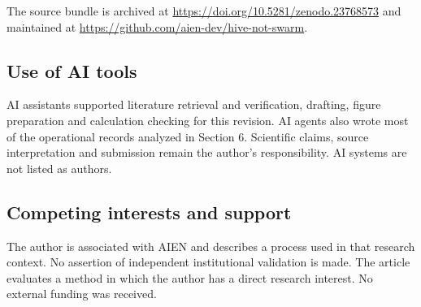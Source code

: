 \documentclass[11pt]{article}
\begin{document}
The source bundle is archived at \url{https://doi.org/10.5281/zenodo.23768573} and maintained at \url{https://github.com/aien-dev/hive-not-swarm}.

\subsection*{Use of AI tools}

AI assistants supported literature retrieval and verification, drafting, figure preparation and calculation checking for this revision. AI agents also wrote most of the operational records analyzed in Section 6. Scientific claims, source interpretation and submission remain the author's responsibility. AI systems are not listed as authors.

\subsection*{Competing interests and support}

The author is associated with AIEN and describes a process used in that research context. No assertion of independent institutional validation is made. The article evaluates a method in which the author has a direct research interest. No external funding was received.
\end{document}
